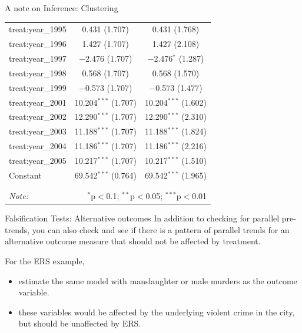 \documentclass[
  ignorenonframetext,
]{beamer}
\begin{document}
\begin{frame}[fragile]{A note on Inference: Clustering}
\begin{table}[!htbp]
\begin{tabular}{@{\extracolsep{5pt}}lcc}
  treat:year\_1995 & 0.431 (1.707) & 0.431 (1.768) \\ 
  treat:year\_1996 & 1.427 (1.707) & 1.427 (2.108) \\ 
  treat:year\_1997 & $-$2.476 (1.707) & $-$2.476$^{*}$ (1.287) \\ 
  treat:year\_1998 & 0.568 (1.707) & 0.568 (1.570) \\ 
  treat:year\_1999 & $-$0.573 (1.707) & $-$0.573 (1.477) \\ 
  treat:year\_2001 & 10.204$^{***}$ (1.707) & 10.204$^{***}$ (1.602) \\ 
  treat:year\_2002 & 12.290$^{***}$ (1.707) & 12.290$^{***}$ (2.310) \\ 
  treat:year\_2003 & 11.188$^{***}$ (1.707) & 11.188$^{***}$ (1.824) \\ 
  treat:year\_2004 & 11.186$^{***}$ (1.707) & 11.186$^{***}$ (2.216) \\ 
  treat:year\_2005 & 10.217$^{***}$ (1.707) & 10.217$^{***}$ (1.510) \\ 
  Constant & 69.542$^{***}$ (0.764) & 69.542$^{***}$ (1.965) \\ 
 \hline \\[-1.8ex] 
\hline 
\hline \\[-1.8ex] 
\textit{Note:}  & \multicolumn{2}{r}{$^{*}$p$<$0.1; $^{**}$p$<$0.05; $^{***}$p$<$0.01} \\ 
\end{tabular} 
\end{table}
\end{frame}

\begin{frame}{Falsification Tests: Alternative outcomes}
\protect\hypertarget{falsification-tests-alternative-outcomes}{}
In addition to checking for parallel pre-trends, you can also check and
see if there is a pattern of parallel trends for an alternative outcome
measure that should not be affected by treatment.

For the ERS example,

\begin{itemize}
\item
  estimate the same model with manslaughter or male murders as the
  outcome variable.
\item
  these variables would be affected by the underlying violent crime in
  the city, but should be unaffected by ERS.
\end{itemize}
\end{frame}
\end{document}
